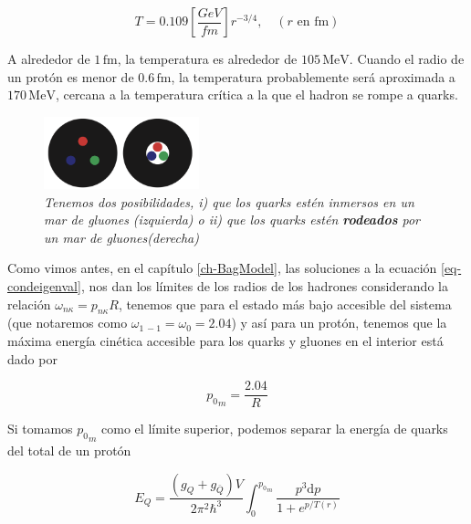 \begin{equation}\label{eq-T(r)}
T = 0.109\left[ \frac{GeV}{fm}\right] {r}^{-3/4}, \quad (r  \text{ en fm})
\end{equation}

A alrededor de $1 \, \mathrm{fm}$, la temperatura es alrededor de $105 \, \mathrm{MeV}$. Cuando el radio de un protón es menor de $0.6 \, \mathrm{fm}$, la temperatura probablemente será aproximada a $170 \, \mathrm{MeV}$, cercana a la temperatura crítica a la que el hadron se rompe a quarks.

\begin{figure}
\centering
\includegraphics[width=0.4\textwidth]{./Images/Bag model-two scenaries.png}
\caption[Posibles estructuras del modelo de bolsa]{
 \emph{Tenemos dos posibilidades, i) que los quarks estén inmersos en un mar de gluones (izquierda) o ii) que los quarks estén \textbf{rodeados} \allowbreak por un mar de gluones(derecha)}}
\label{fig: 2Bag-models}
\end{figure}


Como vimos antes, en el capítulo \ref{ch-BagModel}, las soluciones a la ecuación \eqref{eq-condeigenval}, nos dan los límites de los radios de los hadrones considerando la relación ${\omega}_{n\kappa} = {p}_{n\kappa}{R}$, tenemos que para el estado más bajo accesible del sistema (que notaremos como ${\omega}_{1 \, -1} = {\omega}_{0} = 2.04$) y así para un protón, tenemos que la máxima energía cinética accesible para los quarks y gluones en el interior está dado por

\begin{equation}\label{eq-maxp}
{{p}_{0}}_{m} = \frac{2.04}{R}
\end{equation}

Si tomamos ${{p}_{0}}_{m}$ como el límite superior, podemos separar la energía de quarks del total de un protón

\begin{equation}
{E}_{Q} = \frac{\left({g}_{Q} + {g}_{\bar{Q}} \right) V}{2{\pi}^{2}{\hbar}^{3}} \int_{0}^{{{p}_{0}}_{m}} \frac{{p}^{3} \mathrm{d}p}{1 + {e}^{p/T(r)}}
\end{equation}


